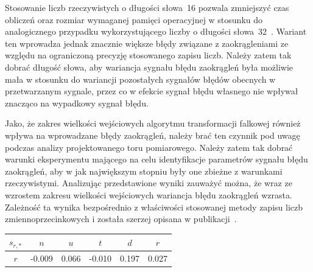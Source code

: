 Stosowanie liczb rzeczywistych o długości słowa~\qty{16}{\bitOw} pozwala zmniejszyć czas obliczeń oraz rozmiar wymaganej pamięci operacyjnej w stosunku do analogicznego przypadku wykorzystującego liczby o długości słowa~\qty{32}{\bitOw}~\cite{reay_dsp, gcc_manual}. Wariant ten wprowadza jednak znacznie większe błędy związane z zaokrągleniami ze względu na ograniczoną precyzję stosowanego zapisu liczb. Należy zatem tak dobrać długość słowa, aby wariancja sygnału błędu zaokrągleń była możliwie mała w stosunku do wariancji pozostałych sygnałów błędów obecnych w przetwarzanym sygnale, przez co w efekcie sygnał błędu własnego nie wpływał znacząco na wypadkowy sygnał błędu.

Jako, że zakres wielkości wejściowych algorytmu transformacji falkowej również wpływa na wprowadzane błędy zaokrągleń, należy brać ten czynnik pod uwagę podczas analizy projektowanego toru pomiarowego. Należy zatem tak dobrać warunki eksperymentu mającego na celu identyfikacje parametrów sygnału błędu zaokrągleń, aby w jak największym stopniu były one zbieżne z warunkami rzeczywistymi. Analizując przedstawione wyniki zauważyć można, że wraz ze wzrostem zakresu wielkości wejściowych wariancja błędu zaokrągleń wzrasta. Zależność ta wynika bezpośrednio z właściwości stosowanej metody zapisu liczb zmiennoprzecinkowych i została szerzej opisana w publikacji~\cite{benz_floats}.

\begin{table}[htb!]
\begin{center}
\begin{tabular}[c]{| c *{5}{| S[table-format = +1.3] } |} \hline
$s_{r,*}$ & \textbf{$n$} & \textbf{$u$} & \textbf{$t$} & \textbf{$d$} & \textbf{$r$} \\ \hline
$r$       & -0.009       & 0.066        & -0.010       & 0.197        & 0.027        \\ \hline
\end{tabular}
\end{center}
\end{table}

